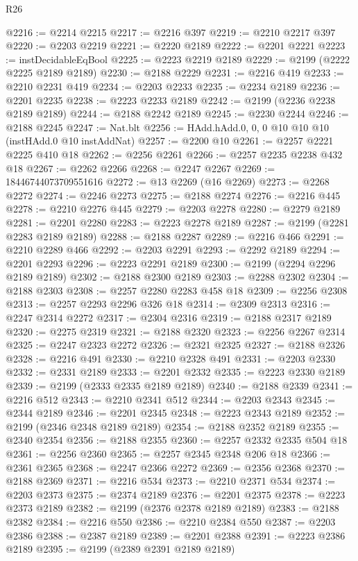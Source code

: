 \begin{lexlean}{R26}
\begin{coremodule}
@2216 := @2214 @2215
@2217 := @2216 @397
@2219 := @2210 @2217 @397
@2220 := @2203 @2219
@2221 := @2220 @2189
@2222 := @2201 @2221
@2223 := instDecidableEqBool
@2225 := @2223 @2219 @2189
@2229 := @2199 (@2222 @2225 @2189 @2189)
@2230 := @2188 @2229
@2231 := @2216 @419
@2233 := @2210 @2231 @419
@2234 := @2203 @2233
@2235 := @2234 @2189
@2236 := @2201 @2235
@2238 := @2223 @2233 @2189
@2242 := @2199 (@2236 @2238 @2189 @2189)
@2244 := @2188 @2242 @2189
@2245 := @2230 @2244
@2246 := @2188 @2245
@2247 := Nat.blt
@2256 := HAdd.hAdd.{0, 0, 0} @10 @10 @10 (instHAdd.{0} @10 instAddNat)
@2257 := @2200 @10
@2261 := @2257 @2221 @2225 @410 @18
@2262 := @2256 @2261
@2266 := @2257 @2235 @2238 @432 @18
@2267 := @2262 @2266
@2268 := @2247 @2267
@2269 := 18446744073709551616
@2272 := @13 @2269 (@16 @2269)
@2273 := @2268 @2272
@2274 := @2246 @2273
@2275 := @2188 @2274
@2276 := @2216 @445
@2278 := @2210 @2276 @445
@2279 := @2203 @2278
@2280 := @2279 @2189
@2281 := @2201 @2280
@2283 := @2223 @2278 @2189
@2287 := @2199 (@2281 @2283 @2189 @2189)
@2288 := @2188 @2287
@2289 := @2216 @466
@2291 := @2210 @2289 @466
@2292 := @2203 @2291
@2293 := @2292 @2189
@2294 := @2201 @2293
@2296 := @2223 @2291 @2189
@2300 := @2199 (@2294 @2296 @2189 @2189)
@2302 := @2188 @2300 @2189
@2303 := @2288 @2302
@2304 := @2188 @2303
@2308 := @2257 @2280 @2283 @458 @18
@2309 := @2256 @2308
@2313 := @2257 @2293 @2296 @326 @18
@2314 := @2309 @2313
@2316 := @2247 @2314 @2272
@2317 := @2304 @2316
@2319 := @2188 @2317 @2189
@2320 := @2275 @2319
@2321 := @2188 @2320
@2323 := @2256 @2267 @2314
@2325 := @2247 @2323 @2272
@2326 := @2321 @2325
@2327 := @2188 @2326
@2328 := @2216 @491
@2330 := @2210 @2328 @491
@2331 := @2203 @2330
@2332 := @2331 @2189
@2333 := @2201 @2332
@2335 := @2223 @2330 @2189
@2339 := @2199 (@2333 @2335 @2189 @2189)
@2340 := @2188 @2339
@2341 := @2216 @512
@2343 := @2210 @2341 @512
@2344 := @2203 @2343
@2345 := @2344 @2189
@2346 := @2201 @2345
@2348 := @2223 @2343 @2189
@2352 := @2199 (@2346 @2348 @2189 @2189)
@2354 := @2188 @2352 @2189
@2355 := @2340 @2354
@2356 := @2188 @2355
@2360 := @2257 @2332 @2335 @504 @18
@2361 := @2256 @2360
@2365 := @2257 @2345 @2348 @206 @18
@2366 := @2361 @2365
@2368 := @2247 @2366 @2272
@2369 := @2356 @2368
@2370 := @2188 @2369
@2371 := @2216 @534
@2373 := @2210 @2371 @534
@2374 := @2203 @2373
@2375 := @2374 @2189
@2376 := @2201 @2375
@2378 := @2223 @2373 @2189
@2382 := @2199 (@2376 @2378 @2189 @2189)
@2383 := @2188 @2382
@2384 := @2216 @550
@2386 := @2210 @2384 @550
@2387 := @2203 @2386
@2388 := @2387 @2189
@2389 := @2201 @2388
@2391 := @2223 @2386 @2189
@2395 := @2199 (@2389 @2391 @2189 @2189)

\end{coremodule}
\end{lexlean}
